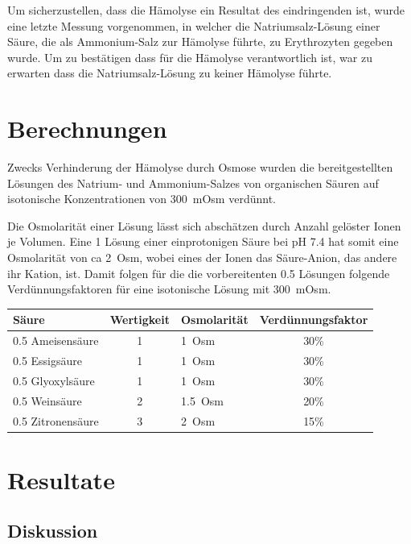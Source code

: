 \documentclass[a4paper,german]{scrreprt}
\begin{document}
Um sicherzustellen, dass die Hämolyse ein Resultat des eindringenden 
ist, wurde eine letzte Messung vorgenommen, in welcher die Natriumsalz-Lösung
einer Säure, die als Ammonium-Salz zur Hämolyse führte, zu Erythrozyten
gegeben wurde. Um zu bestätigen dass  für die Hämolyse verantwortlich
ist, war zu erwarten dass die Natriumsalz-Lösung zu keiner Hämolyse führte.

\chapter{Berechnungen}

Zwecks Verhinderung der Hämolyse durch Osmose wurden die bereitgestellten
Lösungen des Natrium- und Ammonium-Salzes von organischen Säuren auf
isotonische Konzentrationen von \SI{300}{mOsm} verdünnt.

Die Osmolarität einer Lösung lässt sich abschätzen durch Anzahl gelöster Ionen
je Volumen. Eine \SI{1}{\Molar} Lösung einer einprotonigen Säure bei \si{pH}
7.4 hat somit eine Osmolarität von ca \SI{2}{Osm}, wobei eines der Ionen das
Säure-Anion, das andere ihr Kation, ist. Damit folgen für die die
vorbereitenten \SI{0.5}{\Molar} Lösungen folgende Verdünnungsfaktoren für eine
isotonische Lösung mit \SI{300}{mOsm}.
\\

\begin{tabu}{lclc}
	\toprule
	Säure & Wertigkeit & Osmolarität & Verdünnungsfaktor \\
	\midrule
	\SI{0.5}{\Molar} Ameisensäure  & 1 & \SI{1}{Osm}   & 30\% \\
	\SI{0.5}{\Molar} Essigsäure    & 1 & \SI{1}{Osm}   & 30\% \\
	\SI{0.5}{\Molar} Glyoxylsäure  & 1 & \SI{1}{Osm}   & 30\% \\
	\SI{0.5}{\Molar} Weinsäure     & 2 & \SI{1.5}{Osm} & 20\% \\
	\SI{0.5}{\Molar} Zitronensäure & 3 & \SI{2}{Osm}   & 15\% \\
	\bottomrule
\end{tabu}

\chapter{Resultate}

\section{Diskussion}
\end{document}
